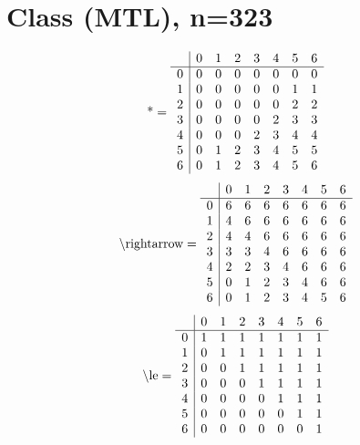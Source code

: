 \documentclass[11pt]{article}
\begin{document}
\section{Class (MTL), n=323}
\[\text{*} = 
\begin{array}{r | r r r r r r r}
 & 0 & 1 & 2 & 3 & 4 & 5 & 6 \\ \hline
0 & 0 & 0 & 0 & 0 & 0 & 0 & 0 \\
1 & 0 & 0 & 0 & 0 & 0 & 1 & 1 \\
2 & 0 & 0 & 0 & 0 & 0 & 2 & 2 \\
3 & 0 & 0 & 0 & 0 & 2 & 3 & 3 \\
4 & 0 & 0 & 0 & 2 & 3 & 4 & 4 \\
5 & 0 & 1 & 2 & 3 & 4 & 5 & 5 \\
6 & 0 & 1 & 2 & 3 & 4 & 5 & 6 \\
\end{array}
\]
\[\text{\textbackslash rightarrow} = 
\begin{array}{r | r r r r r r r}
 & 0 & 1 & 2 & 3 & 4 & 5 & 6 \\ \hline
0 & 6 & 6 & 6 & 6 & 6 & 6 & 6 \\
1 & 4 & 6 & 6 & 6 & 6 & 6 & 6 \\
2 & 4 & 4 & 6 & 6 & 6 & 6 & 6 \\
3 & 3 & 3 & 4 & 6 & 6 & 6 & 6 \\
4 & 2 & 2 & 3 & 4 & 6 & 6 & 6 \\
5 & 0 & 1 & 2 & 3 & 4 & 6 & 6 \\
6 & 0 & 1 & 2 & 3 & 4 & 5 & 6 \\
\end{array}
\]
\[\text{\textbackslash le} = 
\begin{array}{r | r r r r r r r}
 & 0 & 1 & 2 & 3 & 4 & 5 & 6 \\ \hline
0 & 1 & 1 & 1 & 1 & 1 & 1 & 1 \\
1 & 0 & 1 & 1 & 1 & 1 & 1 & 1 \\
2 & 0 & 0 & 1 & 1 & 1 & 1 & 1 \\
3 & 0 & 0 & 0 & 1 & 1 & 1 & 1 \\
4 & 0 & 0 & 0 & 0 & 1 & 1 & 1 \\
5 & 0 & 0 & 0 & 0 & 0 & 1 & 1 \\
6 & 0 & 0 & 0 & 0 & 0 & 0 & 1 \\
\end{array}
\]
\end{document}
